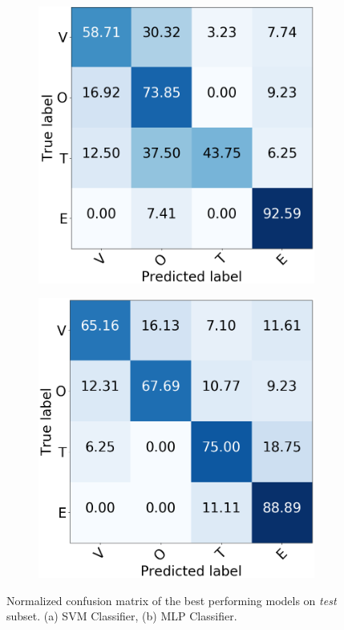 \begin{figure}[h]		
	\centering
	\begin{subfigure}{.4\textwidth}
		\includegraphics[width=\linewidth]{img/cm_test_svm.png}
		\caption{}
		\label{fig:cm_test_svm}
	\end{subfigure}
	\begin{subfigure}{.4\textwidth}
		\includegraphics[width=\linewidth]{img/cm_test_mlp.png}
		\caption{}
		\label{fig:cm_test_mlp}
	\end{subfigure}
	\caption[VOTE Classification - Test set results]{Normalized confusion matrix of the best performing models on \textit{test} subset. (a) SVM Classifier, (b) MLP Classifier.} 
	\label{fig:cm_test}
\end{figure}

